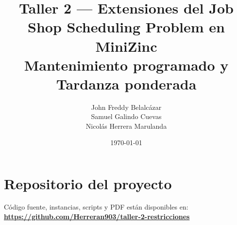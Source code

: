\documentclass[11pt,a4paper]{article}
\title{Taller 2 — Extensiones del Job Shop Scheduling Problem en MiniZinc\\
\large Mantenimiento programado y Tardanza ponderada}
\author{John Freddy Belalcázar \\ Samuel Galindo Cuevas \\ Nicolás Herrera Marulanda}
\date{\today}
\begin{document}
\maketitle
\tableofcontents

\section*{Repositorio del proyecto}
Código fuente, instancias, scripts y PDF están disponibles en:\\
\noindent\textbf{\url{https://github.com/Herreran903/taller-2-restricciones}}














\end{document}
